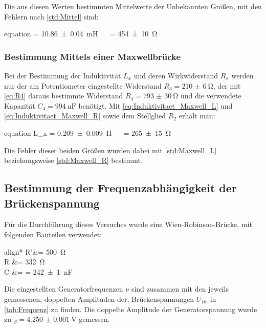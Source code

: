		
		
		Die aus diesen Werten bestimmten Mittelwerte der Unbekannten Größen, mit den Fehlern nach \cref{std:Mittel} sind:
		\begin{empheq}{equation}
				\label{eq:LxRx_Brücke}
				 = \SI{10.86(4)}{\milli\henry} \quad\ \ \quad {} = \SI{454(10)}{\ohm}
		\end{empheq}		
		
		
	\subsubsection{Bestimmung Mittels einer Maxwellbrücke}
	\label{sec:Auswertung_Induktivität_Maxwell}
		
		Bei der Bestimmung der Induktivität $L_{x}$ und deren Wirkwiderstand $R_{x}$ werden 
		nur der am Potentiometer eingestellte Widerstand $R_{3}= \SI{210(6)}{\ohm} $, der mit \cref{eq:R4} 
		daraus bestimmte Widerstand $R_{4} = \SI{793(30)}{\ohm}$ und die verwendete Kapazität $C_{4} = 
		\SI{994}{\nano\farad}$  benötigt. Mit \cref{eq:Induktivitaet_Maxwell_L} und \cref{eq:Induktivitaet_Maxwell_R}
		sowie dem Stellglied $R_{2}$ erhält man:
		\begin{empheq}{equation}
				\label{eq:LxRx_Maxwell}
				{L_{x}} = \SI{0.209(9)}{\henry} \quad\ \  = \SI{265(15)}{\ohm}
		\end{empheq}
		Die Fehler dieser beiden Größen wurden dabei mit \cref{std:Maxwell_L}
		beziehungsweise \cref{std:Maxwell_R} bestimmt.
		
\subsection{Bestimmung der Frequenzabhängigkeit der Brückenspannung}
\label{sec:Auswertung_Frequenz}
	
	Für die Durchführung dieses Versuches wurde eine Wien-Robinson-Brücke, mit folgenden Bauteilen
	verwendet:
	\begin{empheq}{align*}
			R'&= \SI{500}{\ohm}\\
			R &= \SI{332}{\ohm} \\
			C &=  \footnotemark = \SI{242(1)}{\nano\farad}
	\end{empheq}		
	
	Die eingestellten Generatorfrequenzen $\nu$ sind zusammen mit den jeweils gemessenen, doppelten Amplituden der, 
	Brückenspannungen $U_{Br}$ in \cref{tab:Frequenz} zu finden. Die doppelte Amplitude der Generatorspannung wurde zu
	$_{S} = \SI{4.250(1)}{\volt}$ gemessen. 
	
